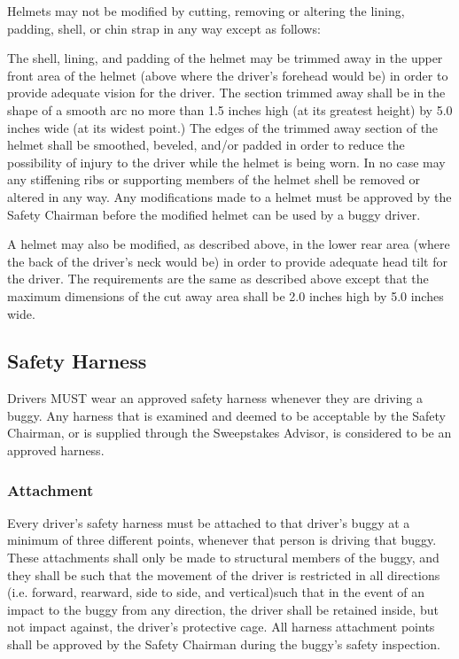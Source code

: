 	Helmets may not be modified by cutting, removing or altering the lining,
	padding, shell, or chin strap in any way except as follows:

	The shell, lining, and padding of the helmet may be trimmed away in the upper
	front area of the helmet (above where the driver's forehead would be) in order
	to provide adequate vision for the driver. The section trimmed away shall be in
	the shape of a smooth arc no more than 1.5 inches high (at its greatest height)
	by 5.0 inches wide (at its widest point.) The edges of the trimmed away section
	of the helmet shall be smoothed, beveled, and/or padded in order to reduce the
	possibility of injury to the driver while the helmet is being worn. In no case
	may any stiffening ribs or supporting members of the helmet shell be removed or
	altered in any way. Any modifications made to a helmet must be approved by the
	Safety Chairman before the modified helmet can be used by a buggy driver.

	A helmet may also be modified, as described above, in the lower rear area
	(where the back of the driver's neck would be) in order to provide adequate
	head tilt for the driver. The requirements are the same as described above
	except that the maximum dimensions of the cut away area shall be 2.0 inches
	high by 5.0 inches wide.

\subsection{Safety Harness}

	Drivers MUST wear an approved safety harness whenever they are driving a buggy.
	Any harness that is examined and deemed to be acceptable by the Safety
	Chairman, or is supplied through the Sweepstakes Advisor, is considered to be
	an approved harness.

\subsubsection{Attachment}

	Every driver's safety harness must be attached to that driver's buggy at a
	minimum of three different points, whenever that person is driving that buggy.
	These attachments shall only be made to structural members of the buggy, and
	they shall be such that the movement of the driver is restricted in all
	directions (i.e. forward, rearward, side to side, and vertical)such that in the
	event of an impact to the buggy from any direction, the driver shall be
	retained inside, but not impact against, the driver's protective cage. All
	harness attachment points shall be approved by the Safety Chairman during the
	buggy's safety inspection.

